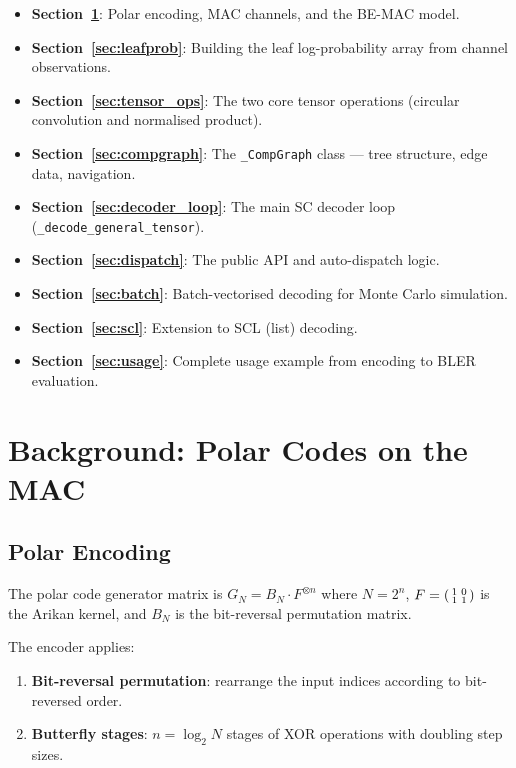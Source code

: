 \documentclass[11pt,a4paper]{article}
\begin{document}
\begin{itemize}
    \item \textbf{Section~\ref{sec:background}}: Polar encoding, MAC channels, and the BE-MAC model.
    \item \textbf{Section~\ref{sec:leafprob}}: Building the leaf log-probability array from channel observations.
    \item \textbf{Section~\ref{sec:tensor_ops}}: The two core tensor operations (circular convolution and normalised product).
    \item \textbf{Section~\ref{sec:compgraph}}: The \texttt{\_CompGraph} class --- tree structure, edge data, navigation.
    \item \textbf{Section~\ref{sec:decoder_loop}}: The main SC decoder loop (\texttt{\_decode\_general\_tensor}).
    \item \textbf{Section~\ref{sec:dispatch}}: The public API and auto-dispatch logic.
    \item \textbf{Section~\ref{sec:batch}}: Batch-vectorised decoding for Monte Carlo simulation.
    \item \textbf{Section~\ref{sec:scl}}: Extension to SCL (list) decoding.
    \item \textbf{Section~\ref{sec:usage}}: Complete usage example from encoding to BLER evaluation.
\end{itemize}


\section{Background: Polar Codes on the MAC}
\label{sec:background}

\subsection{Polar Encoding}

The polar code generator matrix is $G_N = B_N \cdot F^{\otimes n}$ where $N = 2^n$,
$F = \begin{psmallmatrix} 1 & 0 \\ 1 & 1 \end{psmallmatrix}$ is the Arikan kernel, and $B_N$ is the bit-reversal permutation matrix.

The encoder applies:
\begin{enumerate}
    \item \textbf{Bit-reversal permutation}: rearrange the input indices according to bit-reversed order.
    \item \textbf{Butterfly stages}: $n = \log_2 N$ stages of XOR operations with doubling step sizes.
\end{enumerate}
\end{document}
